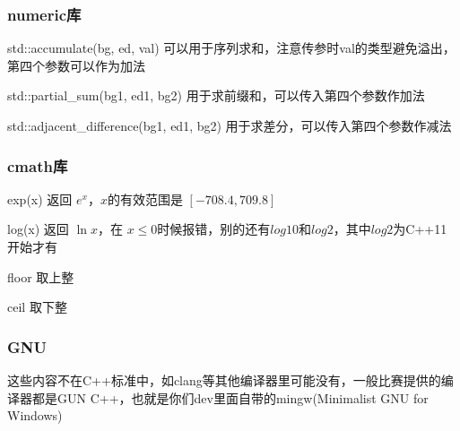 \documentclass{beamer}
\begin{document}
  \begin{frame}
    \frametitle{numeric库}
    \begin{block}{std::accumulate(bg, ed, val)}
      可以用于序列求和，注意传参时val的类型避免溢出，第四个参数可以作为加法
    \end{block}

    \begin{block}{std::partial\_sum(bg1, ed1, bg2)}
      用于求前缀和，可以传入第四个参数作加法
    \end{block}

    \begin{block}{std::adjacent\_difference(bg1, ed1, bg2)}
      用于求差分，可以传入第四个参数作减法
    \end{block}
    
  \end{frame}

  \begin{frame}
    \frametitle{cmath库}
      \begin{block}{exp(x)}
        返回 $e^x$，$x$的有效范围是 $[−708.4,709.8]$
      \end{block}

      \begin{block}{log(x)}
        返回 $\ln{x}$，在 $x\leq0$时候报错，别的还有$log10$和$log2$，其中$log2$为C++11开始才有
      \end{block}

      floor 取上整

      ceil 取下整
  \end{frame}

  \begin{frame}
    \frametitle{GNU}

    这些内容不在C++标准中，如clang等其他编译器里可能没有，一般比赛提供的编译器都是GUN C++，也就是你们dev里面自带的mingw(Minimalist GNU for Windows)
    
  \end{frame}
\end{document}
